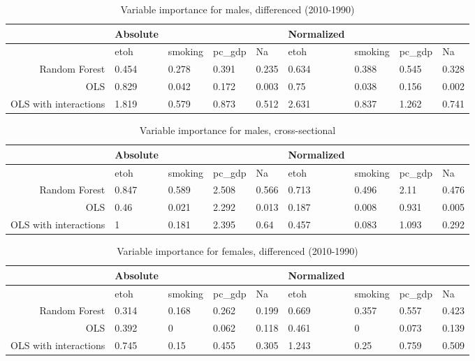 \documentclass[11pt]{article}\usepackage[]{graphicx}\usepackage[]{color}
\begin{document}
 
\begin{table}[ht]
\centering
\begin{tabular}{r|llll|llll}
   \hline
 & Absolute &  &  &  & Normalized &  &  &  \\ 
   \hline
   & etoh & smoking & pc\_gdp & Na & etoh & smoking & pc\_gdp & Na \\ 
   \hline
Random Forest & 0.454 & 0.278 & 0.391 & 0.235 & 0.634 & 0.388 & 0.545 & 0.328 \\ 
  OLS & 0.829 & 0.042 & 0.172 & 0.003 & 0.75 & 0.038 & 0.156 & 0.002 \\ 
  OLS with interactions & 1.819 & 0.579 & 0.873 & 0.512 & 2.631 & 0.837 & 1.262 & 0.741 \\ 
   \hline
\end{tabular}
\caption{Variable importance for males, differenced (2010-1990)} 
\end{table}
\begin{table}[ht]
\centering
\begin{tabular}{r|llll|llll}
   \hline
 & Absolute &  &  &  & Normalized &  &  &  \\ 
   \hline
   & etoh & smoking & pc\_gdp & Na & etoh & smoking & pc\_gdp & Na \\ 
   \hline
Random Forest & 0.847 & 0.589 & 2.508 & 0.566 & 0.713 & 0.496 & 2.11 & 0.476 \\ 
  OLS & 0.46 & 0.021 & 2.292 & 0.013 & 0.187 & 0.008 & 0.931 & 0.005 \\ 
  OLS with interactions & 1 & 0.181 & 2.395 & 0.64 & 0.457 & 0.083 & 1.093 & 0.292 \\ 
   \hline
\end{tabular}
\caption{Variable importance for males, cross-sectional} 
\end{table}
\begin{table}[ht]
\centering
\begin{tabular}{r|llll|llll}
   \hline
 & Absolute &  &  &  & Normalized &  &  &  \\ 
   \hline
   & etoh & smoking & pc\_gdp & Na & etoh & smoking & pc\_gdp & Na \\ 
   \hline
Random Forest & 0.314 & 0.168 & 0.262 & 0.199 & 0.669 & 0.357 & 0.557 & 0.423 \\ 
  OLS & 0.392 & 0 & 0.062 & 0.118 & 0.461 & 0 & 0.073 & 0.139 \\ 
  OLS with interactions & 0.745 & 0.15 & 0.455 & 0.305 & 1.243 & 0.25 & 0.759 & 0.509 \\ 
   \hline
\end{tabular}
\caption{Variable importance for females, differenced (2010-1990)} 
\end{table}
\end{document}
